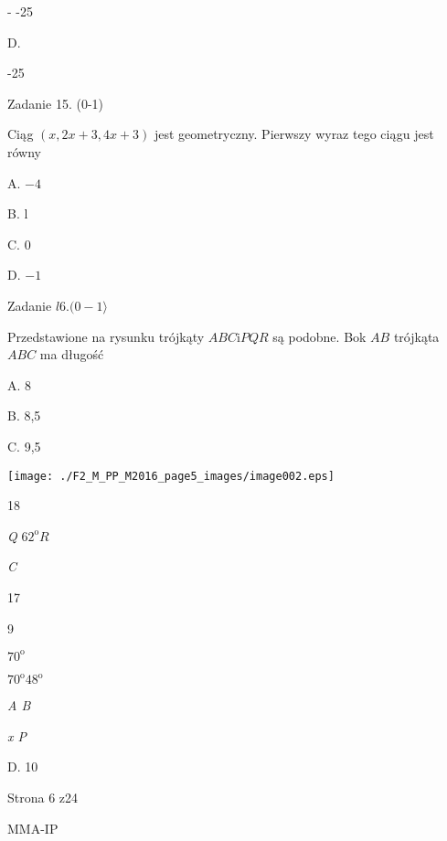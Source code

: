 \documentclass[a4paper,12pt]{article}
\begin{document}
- -25

D.

-25

Zadanie 15. (0-1)

Ciąg $(x,2x+3,4x+3)$ jest geometryczny. Pierwszy wyraz tego ciągu jest równy

A. $-4$

B. l

C. 0

D. $-1$

Zadanie $l6. (0-1\rangle$

Przedstawione na rysunku trójkąty $ABC\mathrm{i}PQR$ są podobne. Bok $AB$ trójkąta $ABC$ ma długość

A. 8

B. 8,5

C. 9,5
\begin{center}
\texttt{[image: ./F2\_M\_PP\_M2016\_page5\_images/image002.eps]}
\end{center}
18

{\it Q} $62^{\mathrm{o}} R$

{\it C}

17

9

$70^{\mathrm{o}}$

$70^{\mathrm{o}}  48^{\mathrm{o}}$

{\it A B}

{\it x  P}

D. 10

Strona 6 z24

MMA-IP
\end{document}
